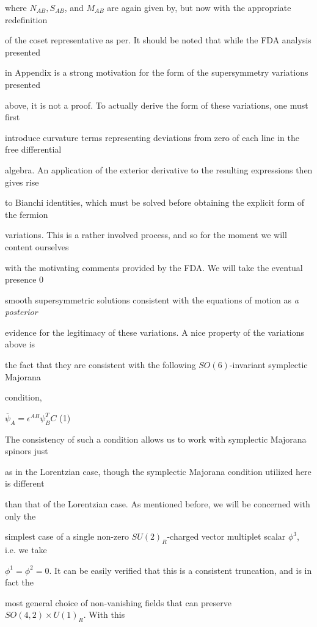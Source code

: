 \documentclass[a4paper,12pt]{article}
\begin{document}
where $N_{AB}, S_{AB}$, and $M_{AB}$ are again given by, but now with the appropriate redefinition

of the coset representative as per. It should be noted that while the FDA analysis presented

in Appendix is a strong motivation for the form of the supersymmetry variations presented

above, it is not a proof. To actually derive the form of these variations, one must first

introduce curvature terms representing deviations from zero of each line in the free differential

algebra. An application of the exterior derivative to the resulting expressions then gives rise

to Bianchi identities, which must be solved before obtaining the explicit form of the fermion

variations. This is a rather involved process, and so for the moment we will content ourselves

with the motivating comments provided by the FDA. We will take the eventual presence $0$

smooth supersymmetric solutions consistent with the equations of motion as {\it a posterior}

evidence for the legitimacy of these variations. A nice property of the variations above is

the fact that they are consistent with the following $SO(6)$-invariant symplectic Majorana

condition,
\begin{center}
$\overline{\psi}_{A}=\epsilon^{AB}\psi_{B}^{T}C$   (1)
\end{center}
The consistency of such a condition allows us to work with symplectic Majorana spinors just

as in the Lorentzian case, though the symplectic Majorana condition utilized here is different

than that of the Lorentzian case. As mentioned before, we will be concerned with only the

simplest case of a single non-zero $SU(2)_{R}$-charged vector multiplet scalar $\phi^{3}$, i.e. we take

$\phi^{1} =\phi^{2}=0$. It can be easily verified that this is a consistent truncation, and is in fact the

most general choice of non-vanishing fields that can preserve $SO(4,2) \times U(1)_{R}$. With this
\end{document}
